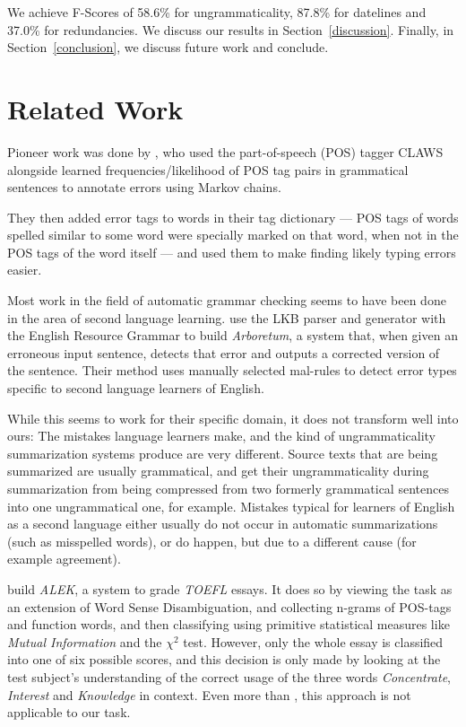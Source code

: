 \documentclass[a4paper,10pt]{scrartcl}
\theoremstyle{style}
\begin{document}
We achieve F-Scores of 58.6\% for ungrammaticality, 87.8\% for datelines and 37.0\% for redundancies. We discuss our results in Section~\ref{discussion}. Finally, in Section~\ref{conclusion}, we discuss future work and conclude.

\section{Related Work}
\label{related_work}

Pioneer work was done by \cite{atwell1987detect}, who used the part-of-speech (POS) tagger CLAWS \citep{leech1983automatic} alongside learned frequencies/likelihood of POS tag pairs in grammatical sentences to annotate errors using Markov chains.

They then added error tags to words in their tag dictionary --- POS tags of words spelled similar to some word were specially marked on that word, when not in the POS tags of the word itself  --- and used them to make finding likely typing errors easier.

Most work in the field of automatic grammar checking seems to have been done in the area of second language learning.
\cite{bender2004arboretum} use the LKB parser and generator \cite{copestake2002implementing} with the English Resource Grammar \citep{flickinger2000building} to build \textit{Arboretum}, a system that, when given an erroneous input sentence, detects that error and outputs a corrected version of the sentence. Their method uses manually selected mal-rules \citep{schneider1998recognizing} to detect error types specific to second language learners of English.

While this seems to work for their specific domain, it does not transform well into ours: The mistakes language learners make, and the kind of ungrammaticality summarization systems produce are very different. Source texts that are being summarized are usually grammatical, and get their ungrammaticality during summarization from being compressed from two formerly grammatical sentences into one ungrammatical one, for example. Mistakes typical for learners of English as a second language either usually do not occur in automatic summarizations (such as misspelled words), or do happen, but due to a different cause (for example agreement).

\cite{chodorow2000unsupervised} build \textit{ALEK}, a system to grade \textit{TOEFL} essays. It does so by viewing the task as an extension of Word Sense Disambiguation, and collecting n-grams of POS-tags and function words, and then classifying using primitive statistical measures like \textit{Mutual Information} and the $\chi^2$ test. However, only the whole essay is classified into one of six possible scores, and this decision is only made by looking at the test subject's understanding of the correct usage of the three words \textit{Concentrate}, \textit{Interest} and \textit{Knowledge} in context.
Even more than \cite{bender2004arboretum}, this approach is not applicable to our task.
\end{document}
